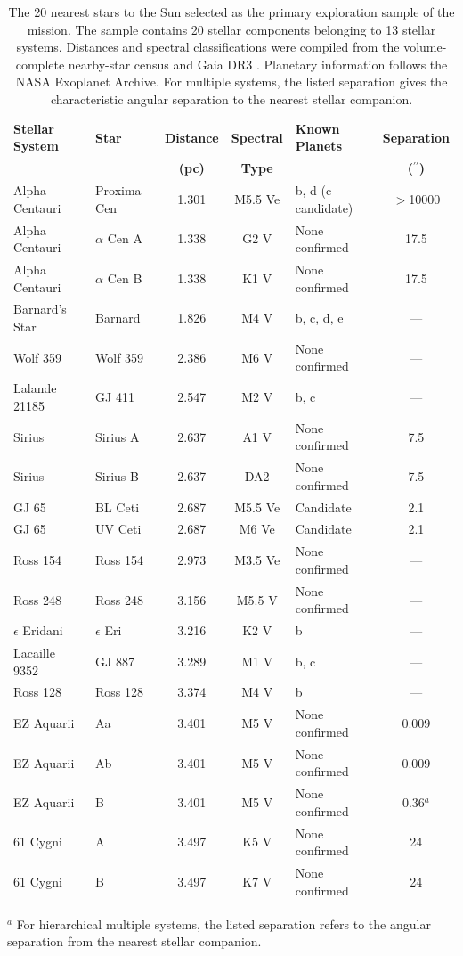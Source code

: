 \begin{table}[ht]
\small
\begin{tabularx}{\textwidth}{l l c c X c}
\hline
\textbf{Stellar System} &
\textbf{Star} &
\textbf{Distance} &
\textbf{Spectral} &
\textbf{Known Planets} &
\textbf{Separation} \\
&
&
\textbf{(pc)} &
\textbf{Type} &
&
\textbf{($^{\prime\prime}$)}\\
\hline
Alpha Centauri & Proxima Cen & 1.301 & M5.5 Ve & b, d (c candidate) & $>$10000 \\
Alpha Centauri & $\alpha$ Cen A & 1.338 & G2 V & None confirmed & 17.5 \\
Alpha Centauri & $\alpha$ Cen B & 1.338 & K1 V & None confirmed & 17.5 \\
Barnard's Star & Barnard & 1.826 & M4 V & b, c, d, e & --- \\
Wolf 359 & Wolf 359 & 2.386 & M6 V & None confirmed & --- \\
Lalande 21185 & GJ 411 & 2.547 & M2 V & b, c & --- \\
Sirius & Sirius A & 2.637 & A1 V & None confirmed & 7.5 \\
Sirius & Sirius B & 2.637 & DA2 & None confirmed & 7.5 \\
GJ 65 & BL Ceti & 2.687 & M5.5 Ve & Candidate & 2.1 \\
GJ 65 & UV Ceti & 2.687 & M6 Ve & Candidate & 2.1 \\
Ross 154 & Ross 154 & 2.973 & M3.5 Ve & None confirmed & --- \\
Ross 248 & Ross 248 & 3.156 & M5.5 V & None confirmed & --- \\
$\epsilon$ Eridani & $\epsilon$ Eri & 3.216 & K2 V & b & --- \\
Lacaille 9352 & GJ 887 & 3.289 & M1 V & b, c & --- \\
Ross 128 & Ross 128 & 3.374 & M4 V & b & --- \\
EZ Aquarii & Aa & 3.401 & M5 V & None confirmed & 0.009 \\
EZ Aquarii & Ab & 3.401 & M5 V & None confirmed & 0.009 \\
EZ Aquarii & B & 3.401 & M5 V & None confirmed & 0.36$^{a}$ \\
61 Cygni & A & 3.497 & K5 V & None confirmed & 24 \\
61 Cygni & B & 3.497 & K7 V & None confirmed & 24 \\
\hline
\end{tabularx}
\vspace{2mm}
\caption{
The 20 nearest stars to the Sun selected as the primary exploration sample of the mission.
The sample contains 20 stellar components belonging to 13 stellar systems.
Distances and spectral classifications were compiled from the volume-complete nearby-star census \cite{reyle21}
and Gaia DR3 \cite{gaiadr3}.
Planetary information follows the NASA Exoplanet Archive.
For multiple systems, the listed separation gives the characteristic angular separation to the nearest stellar companion.
}
\label{tab:nearest20}
\footnotesize
$^{a}$ For hierarchical multiple systems, the listed separation refers to the angular separation from the nearest stellar companion.
\end{table}

